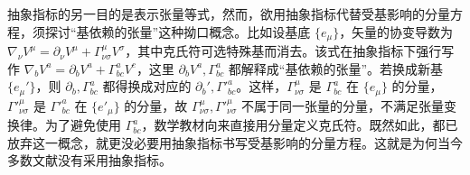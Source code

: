 抽象指标的另一目的是表示张量等式，然而，欲用抽象指标代替受基影响的分量方程，须探讨“基依赖的张量”这种拗口概念。比如设基底 $\{e_\mu\}$，矢量的协变导数为 $\nabla_\nu V^\mu =\partial_\nu{V^\mu}+\Gamma^\mu_{\nu\sigma}V^\sigma$，其中克氏符可选特殊基而消去。该式在抽象指标下强行写作 $\nabla_b V^a =\partial_b{V^a}+\Gamma^a_{bc}V^c$，这里 $\partial_b{V^a},\Gamma^a_{bc}$ 都解释成“基依赖的张量”。若换成新基 $\{e_\mu'\}$，则 $\partial_b,\Gamma^a_{bc}$ 都得换成对应的 $\partial_b',\Gamma'^a_{bc}$。这样，$\Gamma^\mu_{\nu\sigma}$ 是 $\Gamma^a_{bc}$ 在 $\{e_\mu\}$ 的分量，$\Gamma'^\mu_{\nu\sigma}$ 是 $\Gamma'^a_{bc}$ 在 $\{e'_\mu\}$ 的分量，故 $\Gamma^\mu_{\nu\sigma},\Gamma'^\mu_{\nu\sigma}$ 不属于同一张量的分量，不满足张量变换律。为了避免使用 $\Gamma^a_{bc}$，数学教材向来直接用分量定义克氏符。既然如此，都已放弃这一概念，就更没必要用抽象指标书写受基影响的分量方程。这就是为何当今多数文献没有采用抽象指标。